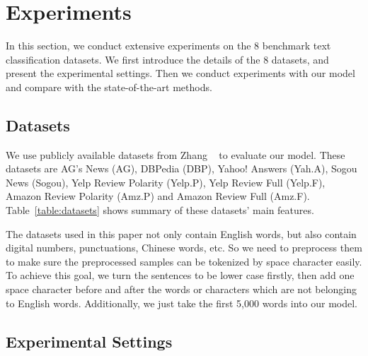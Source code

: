\documentclass[times,twocolumn,final]{elsarticle}
\begin{document}
\section{Experiments}

In this section, we conduct extensive experiments on the 8 benchmark text classification datasets. We first introduce the details of the 8 datasets, and present the experimental settings. Then we conduct experiments with our model and compare with the state-of-the-art methods.

\subsection{Datasets}

We use publicly available datasets from Zhang \etal~\cite{zhang2015character} to evaluate our model. These datasets are AG's News (AG), DBPedia (DBP), Yahoo! Answers (Yah.A), Sogou News (Sogou), Yelp Review Polarity (Yelp.P), Yelp Review Full (Yelp.F), Amazon Review Polarity (Amz.P) and Amazon Review Full (Amz.F). Table~\ref{table:datasets} shows summary of these datasets' main features.

The datasets used in this paper not only contain English words, but also contain digital numbers, punctuations, Chinese words, etc. So we need to preprocess them to make sure the preprocessed samples can be tokenized by space character easily. To achieve this goal, we turn the sentences to be lower case firstly, then add one space character before and after the words or characters which are not belonging to English words. Additionally, we just take the first 5,000 words into our model.

\subsection{Experimental Settings}
\end{document}
